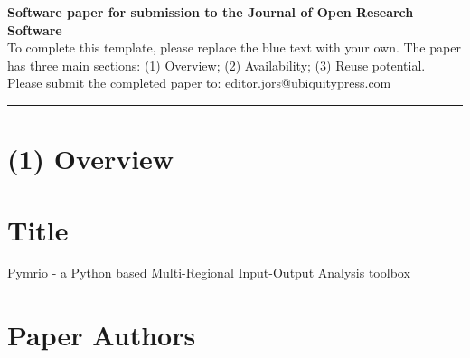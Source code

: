 \documentclass{jors}
\begin{document}
{\bf Software paper for submission to the Journal of Open Research Software} \\

To complete this template, please replace the blue text with your own. The paper has three main sections: (1) Overview; (2) Availability; (3) Reuse potential. \\

Please submit the completed paper to: editor.jors@ubiquitypress.com

\rule{\textwidth}{1pt}

\section*{(1) Overview}

\vspace{0.5cm}

\section*{Title}

Pymrio - a Python based Multi-Regional Input-Output Analysis toolbox

\section*{Paper Authors}
\end{document}
